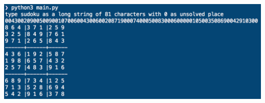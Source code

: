 \documentclass[12pt]{article}
\begin{document}
\begin{spacing}{1.1}
\vspace{2.5ex}
\noindent
\includegraphics[height=6.5cm]{example}


\end{spacing}
\end{document}
